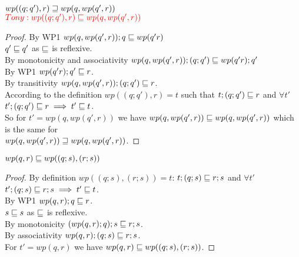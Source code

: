 \documentclass{article}
\begin{document}
\verified


\begin{theorem}[Stepwise wp]
$wp((q; q'), r) \sqsupseteq wp(q, wp(q', r))$\\
$\color{red} Tony: wp((q; q'), r) \sqsubseteq wp(q, wp(q', r))$
\end{theorem}

\begin{proof}
By WP1 $wp(q, wp(q', r)); q \sqsubseteq wp(q' r)$\\
$q' \sqsubseteq q'$ as $\sqsubseteq$ is reflexive.\\
By monotonicity and associativity $wp(q, wp(q', r)); (q; q') \sqsubseteq wp(q' r); q'$\\
By WP1 $wp(q' r); q' \sqsubseteq r$.\\
By transitivity $wp(q, wp(q', r)); (q; q') \sqsubseteq r$.\\
According to the definition $wp((q; q'), r) = t$ such that $t; (q; q') \sqsubseteq r$ and $\forall t'$ $t'; (q; q') \sqsubseteq r \implies t' \sqsubseteq t$.\\
So for $t' = wp(q, wp(q', r))$ we have $wp(q, wp(q', r)) \sqsubseteq wp(q, wp(q', r))$ which is the same for\\
$wp(q, wp(q', r)) \sqsupseteq wp(q, wp(q', r))$.
\end{proof}

\begin{theorem}
$wp(q, r) \sqsubseteq wp((q; s), (r; s))$
\end{theorem}

\begin{proof}
By definition $wp((q; s), (r; s)) = t$: $t; (q; s) \sqsubseteq r; s$ and $\forall t'$ $t'; (q; s) \sqsubseteq r; s \implies t' \sqsubseteq t$.\\
By WP1 $wp(q, r); q \sqsubseteq r$.\\
$s \sqsubseteq s$ as $\sqsubseteq$ is reflexive.\\
By monotonicity $(wp(q, r); q); s \sqsubseteq r; s$.\\
By associativity $wp(q, r); (q; s) \sqsubseteq r; s$.\\
For $t' = wp(q, r)$ we have $wp(q, r) \sqsubseteq wp((q; s), (r; s))$.
\end{proof}
\end{document}
